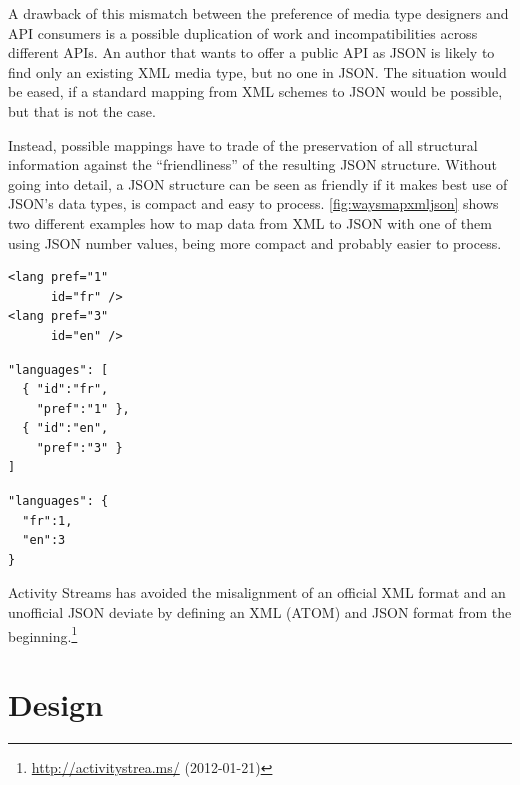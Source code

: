 \documentclass[12pt,a4paper,twoside]{scrartcl}		%
\newcommand{\citeurl}[2]{\url{#1} (#2)}
\begin{document}
A drawback of this mismatch between the preference of media type designers and
API consumers is a possible duplication of work and incompatibilities across
different APIs. An author that wants to offer a public API as JSON is likely to
find only an existing XML media type, but no one in JSON.  The situation would
be eased, if a standard mapping from XML schemes to JSON would be possible, but
that is not the case.

Instead, possible mappings have to trade of the preservation of all structural
information against the ``friendliness'' of the resulting JSON
structure\cite{Boyer2011}. Without going into detail, a JSON structure can be
seen as friendly if it makes best use of JSON's data types, is compact and easy
to process. \autoref{fig:waysmapxmljson} shows two different examples how to map
data from XML to JSON with one of them using JSON number values, being more
compact and probably easier to process.

\begin{multicols}{3}
\begin{lstlisting}[label=fig:waysmapxmljson,
                  captionpos=t,
                  caption={XML fragment}, frame=single]
<lang pref="1"
      id="fr" />
<lang pref="3"
      id="en" />
\end{lstlisting}
\columnbreak
\begin{lstlisting}[title={unfriendly JSON}, frame=single,
                  captionpos=t
]
"languages": [
  { "id":"fr",
    "pref":"1" },
  { "id":"en",
    "pref":"3" }
]
\end{lstlisting}
\columnbreak
\begin{lstlisting}[title={friendly JSON}, frame=single,
                  captionpos=t
]
"languages": {
  "fr":1,
  "en":3
}
\end{lstlisting}
\end{multicols}

Activity Streams has avoided the misalignment of an official XML format and an unofficial JSON deviate by defining an XML (ATOM) and JSON format from the beginning.\footnote{\citeurl{http://activitystrea.ms/}{2012-01-21}}






\section{Design}
\end{document}
